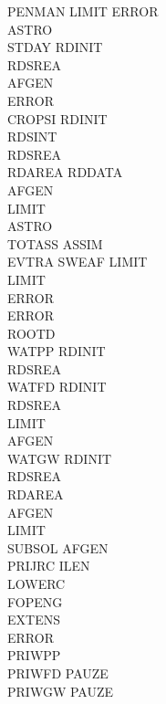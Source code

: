 \begin{tabbing}
\>\> \> \> \> \> \> \> PENMAN\> LIMIT\> ERROR\\
\>\> \> \> \> \> \> \> \> ASTRO\\
\>\> \> \> \> \> STDAY\> \> RDINIT\\
\>\> \> \> \> \> \> \> RDSREA\\
\>\> \> \> \> \> \> \> AFGEN\\
\>\> \> \> \> \> \> \> ERROR\\
\>\> \> \> \> \> CROPSI\> \> RDINIT\\
\>\> \> \> \> \> \> \> RDSINT\\
\>\> \> \> \> \> \> \> RDSREA\\
\>\> \> \> \> \> \> \> RDAREA\> RDDATA\\
\>\> \> \> \> \> \> \> AFGEN\\
\>\> \> \> \> \> \> \> LIMIT\\
\>\> \> \> \> \> \> \> ASTRO\\
\>\> \> \> \> \> \> \> TOTASS\> ASSIM\\
\>\> \> \> \> \> \> \> EVTRA\> SWEAF\> LIMIT\\
\>\> \> \> \> \> \> \> \> LIMIT\\
\>\> \> \> \> \> \> \> ERROR\\
\>\> \> \> \> \> ERROR\\
\>\> \> \> \> \> ROOTD\\
\>\> \> \> \> \> WATPP\> \> RDINIT\\
\>\> \> \> \> \> RDSREA\\
\>\> \> \> \> \> WATFD\> \> RDINIT\\
\>\> \> \> \> \> \> \> RDSREA\\
\>\> \> \> \> \> \> \> LIMIT\\
\>\> \> \> \> \> \> \> AFGEN\\
\>\> \> \> \> \> WATGW\> \> RDINIT\\
\>\> \> \> \> \> \> \> RDSREA\\
\>\> \> \> \> \> \> \> RDAREA\\
\>\> \> \> \> \> \> \> AFGEN\\
\>\> \> \> \> \> \> \> LIMIT\\
\>\> \> \> \> \> \> \> SUBSOL\> AFGEN\\
\>\> \> \> \> \> PRIJRC\> \> ILEN\\
\>\> \> \> \> \> \> \> LOWERC\\
\>\> \> \> \> \> \> \> FOPENG\\
\>\> \> \> \> \> \> \> EXTENS\\
\>\> \> \> \> \> \> \> ERROR\\
\>\> \> \> \> \> PRIWPP\\
\>\> \> \> \> \> PRIWFD\> \> PAUZE\\
\>\> \> \> \> \> PRIWGW\> \> PAUZE
\end{tabbing}

